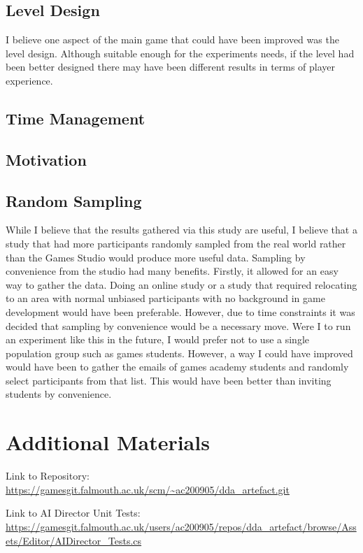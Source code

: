 \documentclass[journal]{IEEEtran}
\begin{document}
\subsection{Level Design}
I believe one aspect of the main game that could have been improved was the level design. Although suitable enough for the experiments needs, if the level had been better designed there may have been different results in terms of player experience. 

\subsection{Time Management}

\subsection{Motivation}

\subsection{Random Sampling}
While I believe that the results gathered via this study are useful, I believe that a study that had more participants randomly sampled from the real world rather than the Games Studio would produce more useful data. Sampling by convenience from the studio had many benefits. Firstly, it allowed for an easy way to gather the data. Doing an online study or a study that required relocating to an area with normal unbiased participants with no background in game development would have been preferable. However, due to time constraints it was decided that sampling by convenience would be a necessary move. 
Were I to run an experiment like this in the future, I would prefer not to use a single population group such as games students. However, a way I could have improved would have been to gather the emails of games academy students and randomly select participants from that list. This would have been better than inviting students by convenience.

\section{Additional Materials}

Link to Repository:
\url{https://gamesgit.falmouth.ac.uk/scm/~ac200905/dda_artefact.git}

Link to AI Director Unit Tests:
\url{https://gamesgit.falmouth.ac.uk/users/ac200905/repos/dda_artefact/browse/Assets/Editor/AIDirector_Tests.cs}
\end{document}

